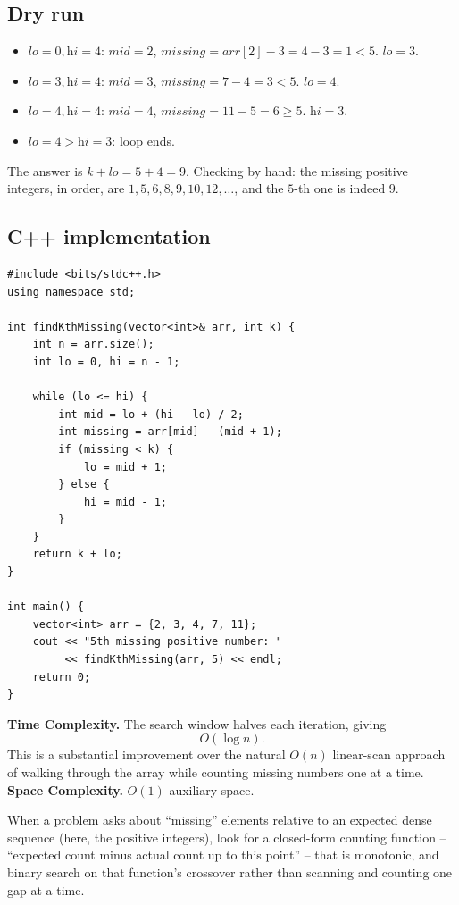 \subsection*{Dry run}


\begin{itemize}
  \item $\textit{lo}=0,\textit{hi}=4$: $\textit{mid}=2$,
        $\textit{missing}=\textit{arr}[2]-3=4-3=1 < 5$. $\textit{lo}=3$.
  \item $\textit{lo}=3,\textit{hi}=4$: $\textit{mid}=3$,
        $\textit{missing}=7-4=3 < 5$. $\textit{lo}=4$.
  \item $\textit{lo}=4,\textit{hi}=4$: $\textit{mid}=4$,
        $\textit{missing}=11-5=6 \ge 5$. $\textit{hi}=3$.
  \item $\textit{lo}=4 > \textit{hi}=3$: loop ends.
\end{itemize}

The answer is $k+\textit{lo} = 5+4 = 9$. Checking by hand: the missing
positive integers, in order, are $1, 5, 6, 8, 9, 10, 12, \dots$, and the
$5$-th one is indeed $9$.

\subsection*{C++ implementation}

\begin{lstlisting}
#include <bits/stdc++.h>
using namespace std;

int findKthMissing(vector<int>& arr, int k) {
    int n = arr.size();
    int lo = 0, hi = n - 1;

    while (lo <= hi) {
        int mid = lo + (hi - lo) / 2;
        int missing = arr[mid] - (mid + 1);
        if (missing < k) {
            lo = mid + 1;
        } else {
            hi = mid - 1;
        }
    }
    return k + lo;
}

int main() {
    vector<int> arr = {2, 3, 4, 7, 11};
    cout << "5th missing positive number: "
         << findKthMissing(arr, 5) << endl;
    return 0;
}
\end{lstlisting}

\begin{complexitybox}
\textbf{Time Complexity.} The search window halves each iteration, giving
\[
  O(\log n).
\]
This is a substantial improvement over the natural $O(n)$ linear-scan
approach of walking through the array while counting missing numbers one
at a time.
\textbf{Space Complexity.} $O(1)$ auxiliary space.
\end{complexitybox}

\begin{takeawaybox}
When a problem asks about ``missing'' elements relative to an expected
dense sequence (here, the positive integers), look for a closed-form
counting function -- ``expected count minus actual count up to this
point'' -- that is monotonic, and binary search on that function's
crossover rather than scanning and counting one gap at a time.
\end{takeawaybox}
